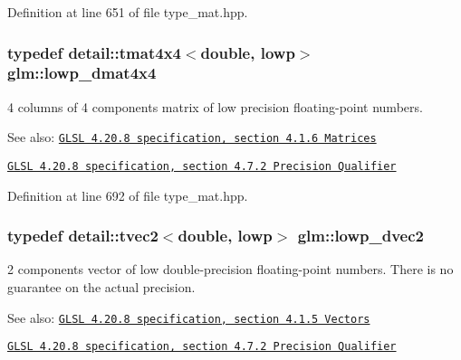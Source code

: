 Definition at line 651 of file type\_\-mat.hpp.\hypertarget{group__core__precision_gc762dec40f53114dfe6894499a2c9a79}{
\subsubsection[lowp\_\-dmat4x4]{\setlength{\rightskip}{0pt plus 5cm}typedef detail::tmat4x4$<$double, lowp$>$ {\bf glm::lowp\_\-dmat4x4}}}
\label{group__core__precision_gc762dec40f53114dfe6894499a2c9a79}


4 columns of 4 components matrix of low precision floating-point numbers.

\begin{Desc}
\item[See also:]\href{http://www.opengl.org/registry/doc/GLSLangSpec.4.20.8.pdf}{\tt GLSL 4.20.8 specification, section 4.1.6 Matrices} 

\href{http://www.opengl.org/registry/doc/GLSLangSpec.4.20.8.pdf}{\tt GLSL 4.20.8 specification, section 4.7.2 Precision Qualifier} \end{Desc}


Definition at line 692 of file type\_\-mat.hpp.\hypertarget{group__core__precision_g27a115a27d5f065e8c043f57191d583b}{
\subsubsection[lowp\_\-dvec2]{\setlength{\rightskip}{0pt plus 5cm}typedef detail::tvec2$<$double, lowp$>$ {\bf glm::lowp\_\-dvec2}}}
\label{group__core__precision_g27a115a27d5f065e8c043f57191d583b}


2 components vector of low double-precision floating-point numbers. There is no guarantee on the actual precision.

\begin{Desc}
\item[See also:]\href{http://www.opengl.org/registry/doc/GLSLangSpec.4.20.8.pdf}{\tt GLSL 4.20.8 specification, section 4.1.5 Vectors} 

\href{http://www.opengl.org/registry/doc/GLSLangSpec.4.20.8.pdf}{\tt GLSL 4.20.8 specification, section 4.7.2 Precision Qualifier} \end{Desc}


